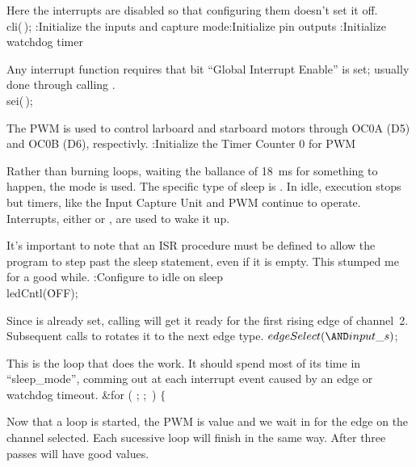 Here the interrupts are disabled so that configuring them doesn't set it off.
\Y\B\\{cli}(\,);\7
:Initialize the inputs and capture mode\X{}:Initialize pin outputs\X%
:Initialize watchdog timer\X\Y\par
\fi

Any interrupt function requires that bit ``Global Interrupt Enable''
is set; usually done through calling .
\Y\B\\{sei}(\,);\Y\par
\fi


The PWM is used to control larboard and starboard motors through OC0A (D5) and
OC0B (D6), respectivly.
\Y\B{}:Initialize the Timer Counter 0 for PWM\X\par
\fi

Rather than burning loops, waiting the ballance of 18~ms for something to
happen, the  mode is used.
The specific type of sleep is .
In idle, execution stops but timers, like the Input Capture Unit and PWM
continue to operate.
Interrupts, either  or ,  are used to
wake it up.

It's important to note that an ISR procedure must be defined to allow the
program to step past the sleep statement, even if it is empty.
This stumped me for a good while.
\Y\B{}:Configure to idle on sleep\X\7
\\{ledCntl}(\.{OFF});\par
\fi

Since  is already set, calling  will get
it ready for
the first rising edge of channel~2.
Subsequent calls to  rotates it to the next edge type.
\Y\B$\\{edgeSelect}({\AND}\\{input\_s}){}$;\par
\fi

This is the loop that does the work.
It should spend most of its time in ``sleep\_mode'', comming out at each
interrupt event caused by an edge or watchdog timeout.
\Y\B\&{for} ( ;  ; \,) $\{{}$\Y\par
\fi

Now that a loop is started, the PWM is value and we wait in
 for the edge on the channel selected. Each sucessive loop will
finish
in the same way.
After three passes  will have good values.

